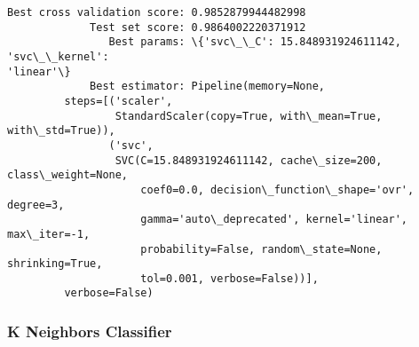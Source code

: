 \documentclass[11pt]{article}
\begin{document}
    \begin{Verbatim}[commandchars=\\\{\}]
Best cross validation score: 0.9852879944482998
             Test set score: 0.9864002220371912
                Best params: \{'svc\_\_C': 15.848931924611142, 'svc\_\_kernel':
'linear'\}
             Best estimator: Pipeline(memory=None,
         steps=[('scaler',
                 StandardScaler(copy=True, with\_mean=True, with\_std=True)),
                ('svc',
                 SVC(C=15.848931924611142, cache\_size=200, class\_weight=None,
                     coef0=0.0, decision\_function\_shape='ovr', degree=3,
                     gamma='auto\_deprecated', kernel='linear', max\_iter=-1,
                     probability=False, random\_state=None, shrinking=True,
                     tol=0.001, verbose=False))],
         verbose=False)
\end{Verbatim}

    \hypertarget{k-neighbors-classifier}{%
\subsubsection{K Neighbors Classifier}\label{k-neighbors-classifier}}
\end{document}
